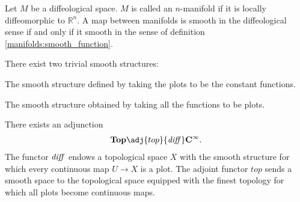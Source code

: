 
    \begin{adefinition}[Manifold]
        Let $M$ be a diffeological space. $M$ is called an $n$-manifold if it is locally diffeomorphic to $\mathbb{R}^n$. A map between manifolds is smooth in the diffeological sense if and only if it smooth in the sense of definition \ref{manifolds:smooth_function}.
    \end{adefinition}

    There exist two trivial smooth structures:
    \begin{example}
        The smooth structure defined by taking the plots to be the constant functions.
    \end{example}
    \begin{example}
        The smooth structure obtained by taking all the functions to be plots.
    \end{example}

    \begin{property}
        There exists an adjunction
        \begin{gather}
            \mathbf{Top}\adj{top}{\text{\textit{diff}}}\mathbf{C^\infty}.
        \end{gather}
        The functor $\text{\textit{diff}}$ endows a topological space $X$ with the smooth structure for which every continuous map $U\rightarrow X$ is a plot. The adjoint functor $top$ sends a smooth space to the topological space equipped with the finest topology for which all plots become continuous maps.
    \end{property}


